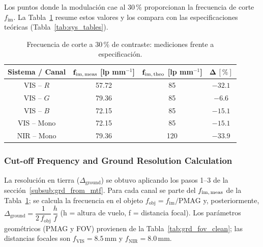     Los puntos donde la modulación cae al \(30\,\%\) proporcionan la frecuencia de corte \(f_{\text{im}}\).  
    La Tabla~\ref{tab:cutoff_meas} resume estos valores y los compara con las especificaciones teóricas (Tabla~\ref{tab:sys_tables}).

    \begin{table}[H]
        \centering
        \caption{Frecuencia de corte a \(30\,\%\) de contraste: mediciones frente a especificación.}
        \label{tab:cutoff_meas}
        \begin{tabular}{|c|c|c|c|}
            \hline
            \rowcolor[HTML]{EFEFEF}
            \textbf{Sistema / Canal} &
            \(\mathbf{f_{\text{im,\,meas}}}\) [lp mm\(^{-1}\)] &
            \(\mathbf{f_{\text{im,\,theo}}}\) [lp mm\(^{-1}\)] &
            \(\mathbf{\Delta\,[\%]}\) \\ \hline
            VIS – \(R\)     &  57.72 & 85  & \(-32.1\) \\ \hline
            VIS – \(G\)     &  79.36 & 85  &  \(-6.6\) \\ \hline
            VIS – \(B\)     &  72.15 & 85  & \(-15.1\) \\ \hline
            VIS – Mono      &  72.15 & 85  & \(-15.1\) \\ \hline
            NIR – Mono      &  79.36 & 120 & \(-33.9\) \\ \hline
        \end{tabular}
    \end{table}

    \subsubsection{Cut-off Frequency and Ground Resolution Calculation}
    \label{subsub:grd_calc}
    La resolución en tierra (\(\Delta_{\text{ground}}\)) se obtuvo aplicando los pasos 1–3 de la sección~\ref{subsub:grd_from_mtf}.  
    Para cada canal se parte del \(f_{\text{im,\,meas}}\) de la Tabla~\ref{tab:cutoff_meas}; se calcula la frecuencia en el objeto
    \(f_{\text{obj}} = f_{\text{im}}/\text{PMAG}\) y, posteriormente,
    \(\Delta_{\text{ground}} = \dfrac{1}{2\,f_{\text{obj}}}\,\dfrac{h}{f}\)
    (h = altura de vuelo, f = distancia focal).  
    Los parámetros geométricos (PMAG y FOV) provienen de la Tabla~\ref{tab:grd_fov_clean}; las distancias focales son
    \(f_{\text{VIS}} = 8.5\,\mathrm{mm}\) y \(f_{\text{NIR}} = 8.0\,\mathrm{mm}\).


